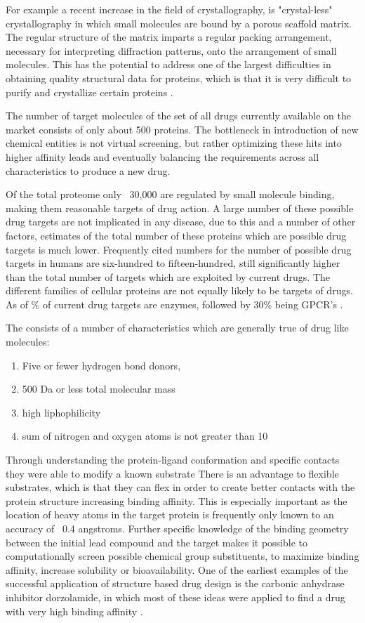 For example a recent increase in the field of crystallography, is "crystal-less" crystallography in which small molecules are bound by a porous scaffold matrix.
The regular structure of the matrix imparts a regular packing arrangement, necessary for interpreting diffraction patterns, onto the arrangement of small molecules.
This has the potential to address one of the largest difficulties in obtaining quality structural data for proteins, which is that it is very difficult to purify and crystallize certain proteins \cite{inokuma2013x}.

The number of target molecules of the set of all drugs currently available on the market consists of only about 500 proteins.
The bottleneck in introduction of new chemical entities is not virtual screening, but rather optimizing these hits into higher affinity leads and eventually balancing the requirements across all characteristics to produce a new drug.
 \cite{bleicher2003hit}

Of the total proteome only ~30,000 are regulated by small molecule binding, making them reasonable targets of drug action.
A large number of these possible drug targets are not implicated in any disease, due to this and a number of other factors, estimates of the total number of these proteins which are possible drug targets is much lower.
Frequently cited numbers for the number of possible drug targets in humans are six-hundred to fifteen-hundred, still significantly higher than the total number of targets which are exploited by current drugs.
The different families of cellular proteins are not equally likely to be targets of drugs.
As of \the{}\% of current drug targets are enzymes, followed by 30\% being GPCR's \cite{hopkins2002druggable}.

The consists of a number of characteristics which are generally true of drug like molecules:
\begin{enumerate}
\item Five or fewer hydrogen bond donors,
\item 500 Da or less total molecular mass
\item high liphophilicity
\item sum of nitrogen and oxygen atoms is not greater than 10 \cite{rule_of_five}
\end{enumerate}

Through understanding the protein-ligand conformation and specific contacts they were able to modify a known substrate 
There is an advantage to flexible substrates, which is that they can flex in order to create better contacts with the protein structure increasing binding affinity.
This is especially important as the location of heavy atoms in the target protein is frequently only known to an accuracy of ~0.4 angstroms.
Further specific knowledge of the binding geometry between the initial lead compound and the target makes it possible to computationally screen possible chemical group substituents, to maximize binding affinity, increase solubility or bioavailability.
One of the earliest examples of the successful application of structure based drug design is the carbonic anhydrase inhibitor dorzolamide, in which most of these ideas were applied to find a drug with very high binding affinity \cite{greer1994application}.

